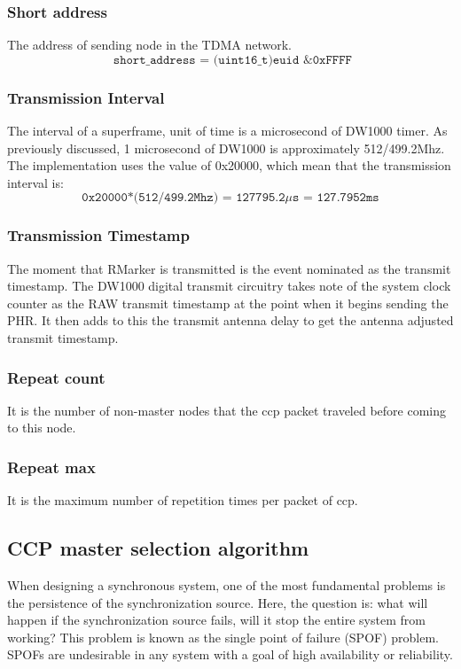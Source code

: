 \documentclass[\main/main.tex]{subfiles}
\begin{document}
\subsubsection{Short address}
The address of sending node in the TDMA network.
\begin{equation}
   \texttt{ short\_address = (uint16\_t)euid \& 0xFFFF}
\end{equation}

\subsubsection{Transmission Interval}
The interval of a superframe, unit of time is a microsecond of DW1000 timer. As previously discussed, 1 microsecond of DW1000 is approximately 512/499.2Mhz. The implementation uses the value of 0x20000, which mean that the transmission interval is:
\begin{equation}
    \texttt{0x20000*(512/499.2Mhz) = 127795.2$\mu$s = 127.7952ms}
\end{equation}

\subsubsection{Transmission Timestamp}
The moment that RMarker is transmitted is the event nominated as the transmit timestamp. The DW1000 digital transmit circuitry takes note of the system clock counter as the RAW transmit timestamp at the point when it begins sending the PHR. It then adds to this the transmit antenna delay to get the antenna adjusted transmit timestamp.

\subsubsection{Repeat count}
It is the number of non-master nodes that the ccp packet traveled before coming to this node.

\subsubsection{Repeat max}
It is the maximum number of repetition times per packet of ccp.

\subsection{CCP master selection algorithm}

When designing a synchronous system, one of the most fundamental problems is the persistence of the synchronization source. Here, the question is: what will happen if the synchronization source fails, will it stop the entire system from working? This problem is known as the single point of failure (SPOF) problem. SPOFs are undesirable in any system with a goal of high availability or reliability.
\end{document}
